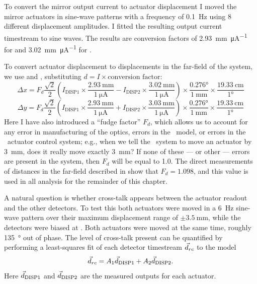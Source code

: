 To convert the mirror output current to actuator displacement I moved the mirror actuators in sine-wave patterns with a frequency of \SI{0.1}{\Hz} using 8 different displacement amplitudes.
I fitted the resulting output current timestream to sine waves.
The results are conversion factors of \SI{2.93}{\mm\per\uA} for  and \SI{3.02}{\mm\per\uA} for .

To convert actuator displacement to displacements in the far-field of the system, we use  and , substituting $d = I \times \text{conversion factor}$:
\begin{equation}
\Delta x = F_d \frac{\sqrt{2}}{2} \left( I_{\text{DISP1}} \times \frac{\SI{2.93}{\mm}}{\SI{1}{\uA}} -
                              I_{\text{DISP2}} \times \frac{\SI{3.02}{\mm}}{\SI{1}{\uA}}  \right) \times
    \frac{\ang{0.276}} {\SI{1}{\mm}} \times
    \frac{\SI{19.33}{\cm}} {\ang{1}}
\end{equation}
\begin{equation}
\Delta y = F_d \frac{\sqrt{2}}{2} \left( I_{\text{DISP1}} \times \frac{\SI{2.93}{\mm}}{\SI{1}{\uA}} +
                              I_{\text{DISP2}} \times \frac{\SI{3.03}{\mm}}{\SI{1}{\uA}}  \right) \times
    \frac{\ang{0.276}} {\SI{1}{\mm}} \times
    \frac{\SI{19.33}{\cm}} {\ang{1}}
\end{equation}
Here I have also introduced a ``fudge factor'' $F_d$, which allows us to account for any error in manufacturing of the optics, errors in the \ZEMAX\ model, or errors in the \BOSE\ actuator control system; e.g., when we tell the \BOSE\ system to move an actuator by \SI{3}{\mm}, does it really move exactly \SI{3}{\mm}?
If none of these --- or other --- errors are present in the system, then $F_d$ will be equal to 1.0.
The direct measurements of distances in the far-field described in  show that $F_d = 1.098$, and this value is used in all analysis for the remainder of this chapter.


A natural question is whether cross-talk appears between the actuator readout and the other detectors.
To test this both actuators were moved in a \SI{6}{\Hz} sine-wave pattern over their maximum displacement range of $\pm\SI{3.5}{\mm}$, while the detectors were biased at \SOC.
Both actuators were moved at the same time, roughly \SI{135}{\degree} out of phase.
The level of cross-talk present can be quantified by performing a least-squares fit of each detector timestream $\vec{d}_{rc}$ to the model
\begin{equation}
	 \vec{d}_{rc} = A_1 \vec{d}_{\text{DISP1}} + A_2 \vec{d}_{\text{DISP2}}.
\end{equation}
Here $\vec{d}_{\text{DISP1}}$ and $\vec{d}_{\text{DISP2}}$ are the measured outputs for each actuator.

